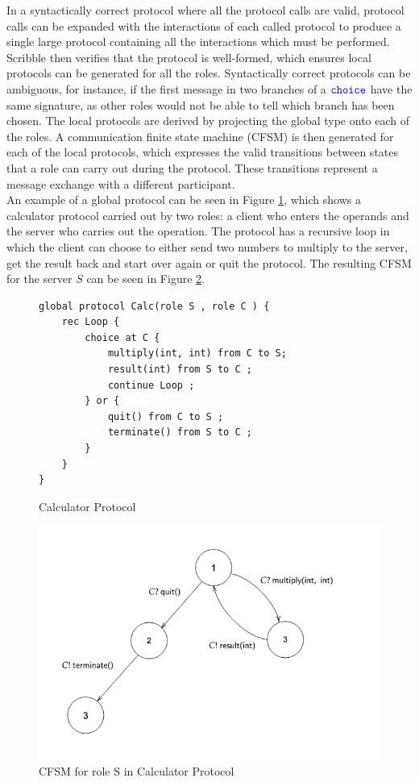 \documentclass[12pt,twoside]{report}
\begin{document}
In a syntactically correct protocol where all the protocol calls are valid, protocol calls can be expanded with the interactions of each called protocol to produce a single large protocol containing all the interactions which must be performed. Scribble then verifies that the protocol is well-formed, which ensures local protocols can be generated for all the roles. Syntactically correct protocols can be ambiguous, for instance, if the first message in two branches of a ${\color{blue}\mathtt{choice}}$ have the same signature, as other roles would not be able to tell which branch has been chosen. The local protocols are derived by projecting the global type onto each of the roles. A communication finite state machine (CFSM) is then generated for each of the local protocols, which expresses the valid transitions between states that a role can carry out during the protocol. These transitions represent a message exchange with a different participant.\\

An example of a global protocol can be seen in Figure \ref{scribble_protocol}, which shows a calculator protocol carried out by two roles: a client who enters the operands and the server who carries out the operation. The protocol has a recursive loop in which the client can choose to either send two numbers to multiply to the server, get the result back and start over again or quit the protocol. The resulting CFSM for the server $S$ can be seen in Figure \ref{scribble_fsm}.\\

\begin{figure}[h]
    \centering
    \lstset{language=Scribble}
    \begin{lstlisting}
global protocol Calc(role S , role C ) {
    rec Loop {
    	choice at C {
    		multiply(int, int) from C to S;
    		result(int) from S to C ;
    		continue Loop ;
    	} or {
    		quit() from C to S ;
    		terminate() from S to C ;
    	}
    }
}
    \end{lstlisting}
    \caption{Calculator Protocol}
    \label{scribble_protocol}
\end{figure}{}

\begin{figure}[h!]
    \centering
    \includegraphics[scale=0.53]{scribble_fsm.png}
    \caption{CFSM for role S in Calculator Protocol}
    \label{scribble_fsm}
\end{figure}{}
\end{document}
